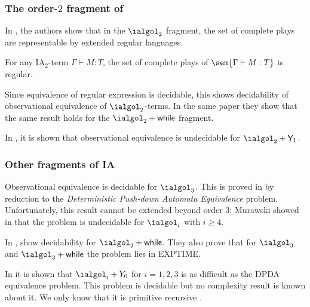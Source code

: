 \subsubsection{The order-\texorpdfstring{$2$}{2} fragment of \ialgol}
In \cite{ghicamccusker00}, the authors show that in the $\ialgol_2$ fragment,
the set of complete plays are representable by extended regular languages.

\begin{lemma}
For any IA$_2$-term $\Gamma \vdash M : T$, the set of complete
plays of $\sem{\Gamma \vdash M : T}$ is regular.
\end{lemma}
Since equivalence of regular expression is decidable, this shows
decidability of observational equivalence of $\ialgol_2$-terms. In
the same paper they show that the same result holds for the
$\ialgol_2 +\textsf{while}$ fragment.

In \cite{Ong02}, it is shown that observational equivalence is
undecidable for $\ialgol_2 + \textsf{Y}_1$.


\subsubsection{Other fragments of IA}

Observational equivalence is decidable for $\ialgol_3$. This is
proved in \cite{Ong02} by reduction to the \emph{Deterministic
Push-down Automata Equivalence} problem. Unfortunately, this result
cannot be extended beyond order $3$: Murawski showed in
\cite{murawski03program} that the problem is undecidable for
$\ialgol_i$ with $i\geq4$.

In \citep{DBLP:conf/fossacs/MurawskiW05},
\citeauthor{DBLP:conf/fossacs/MurawskiW05} show decidability for $\ialgol_3 + \textsf{while}$. They also prove that for $\ialgol_3$ and $\ialgol_3 + \textsf{while}$ the problem lies in EXPTIME.

In \cite{DBLP:conf/icalp/MurawskiOW05} it is shown that
$\ialgol_i +Y_0$ for $i = 1, 2, 3$ is as difficult as the DPDA
equivalence problem. This problem is decidable
\citep{DBLP:journals/tcs/Senizergues01} but no complexity result is
known about it. We only know that it is primitive recursive
\citep{stirling02}.


